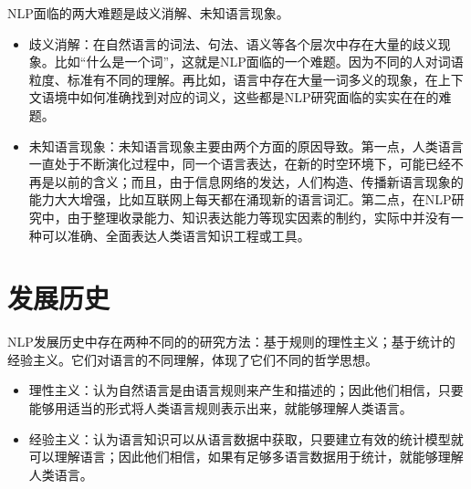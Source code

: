 NLP面临的两大难题是歧义消解、未知语言现象。
\begin{itemize}
\item 歧义消解：在自然语言的词法、句法、语义等各个层次中存在大量的歧义现象。比如“什么是一个词”，这就是NLP面临的一个难题。因为不同的人对词语粒度、标准有不同的理解。再比如，语言中存在大量一词多义的现象，在上下文语境中如何准确找到对应的词义，这些都是NLP研究面临的实实在在的难题。
\item 未知语言现象：未知语言现象主要由两个方面的原因导致。第一点，人类语言一直处于不断演化过程中，同一个语言表达，在新的时空环境下，可能已经不再是以前的含义；而且，由于信息网络的发达，人们构造、传播新语言现象的能力大大增强，比如互联网上每天都在涌现新的语言词汇。第二点，在NLP研究中，由于整理收录能力、知识表达能力等现实因素的制约，实际中并没有一种可以准确、全面表达人类语言知识工程或工具。
\end{itemize}

\section{发展历史}
NLP发展历史中存在两种不同的的研究方法：基于规则的理性主义；基于统计的经验主义。它们对语言的不同理解，体现了它们不同的哲学思想。
\begin{itemize}
\item 理性主义：认为自然语言是由语言规则来产生和描述的；因此他们相信，只要能够用适当的形式将人类语言规则表示出来，就能够理解人类语言。
\item 经验主义：认为语言知识可以从语言数据中获取，只要建立有效的统计模型就可以理解语言；因此他们相信，如果有足够多语言数据用于统计，就能够理解人类语言。
\end{itemize}

